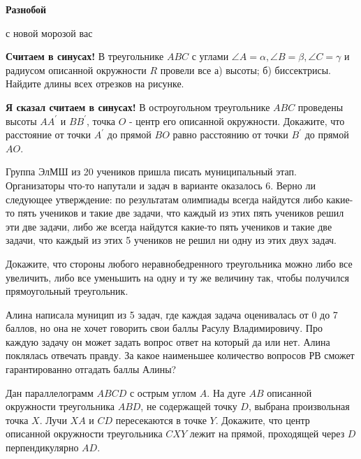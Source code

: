 \centerline{\bf \Huge Разнобой}

\begin{flushright}
        \scriptsize{с новой морозой вас}
\end{flushright}

\textbf{Считаем в синусах!}
В треугольнике $A B C$ с углами $\angle A=\alpha, \angle B=\beta, \angle C=\gamma$ и радиусом описанной окружности $R$ провели все а) высоты; б) биссектрисы. Найдите длины всех отрезков на рисунке.

\textbf{Я сказал считаем в синусах!}
В остроугольном треугольнике $A B C$ проведены высоты $A A^{\prime}$ и $B B^{\prime}$, точка $O$ - центр его описанной окружности. Докажите, что расстояние от точки $A^{\prime}$ до прямой $B O$ равно расстоянию от точки $B^{\prime}$ до прямой $A O$.

Группа ЭлМШ из 20 учеников пришла писать муниципальный этап. Организаторы что-то напутали и задач в варианте оказалось 6. Верно ли следующее утверждение: по результатам олимпиады всегда найдутся либо какие-то пять учеников и такие две задачи, что каждый из этих пять учеников решил эти две задачи, либо же всегда найдутся какие-то пять учеников и такие две задачи, что каждый из этих 5 учеников не решил ни одну из этих двух задач.


Докажите, что стороны любого неравнобедренного треугольника можно либо все увеличить, либо все уменьшить на одну и ту же величину так, чтобы получился прямоугольный треугольник.


Алина написала муницип из 5 задач, где каждая задача оценивалась от 0 до 7 баллов, но она не хочет говорить свои баллы Расулу Владимировичу. Про каждую задачу он может задать вопрос ответ на который да или нет. Алина поклялась отвечать правду. За какое наименьшее количество вопросов РВ сможет гарантированно отгадать баллы Алины?

Дан параллелограмм $A B C D$ с острым углом $A$. На дуге $A B$ описанной окружности треугольника $A B D$, не содержащей точку $D$, выбрана произвольная точка $X$. Лучи $X A$ и $C D$ пересекаются в точке $Y$. Докажите, что центр описанной окружности треугольника $C X Y$ лежит на прямой, проходящей через $D$ перпендикулярно $A D$.


